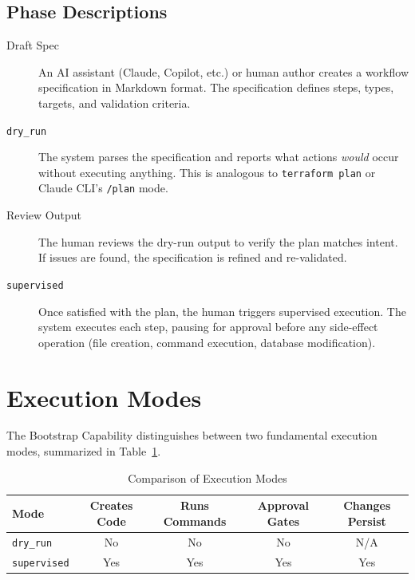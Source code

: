 \documentclass[11pt,letterpaper]{article}
\begin{document}
\subsection{Phase Descriptions}

\begin{description}
    \item[Draft Spec] An AI assistant (Claude, Copilot, etc.) or human author creates a workflow specification in Markdown format. The specification defines steps, types, targets, and validation criteria.
    
    \item[\texttt{dry\_run}] The system parses the specification and reports what actions \textit{would} occur without executing anything. This is analogous to \texttt{terraform plan} or Claude CLI's \texttt{/plan} mode.
    
    \item[Review Output] The human reviews the dry-run output to verify the plan matches intent. If issues are found, the specification is refined and re-validated.
    
    \item[\texttt{supervised}] Once satisfied with the plan, the human triggers supervised execution. The system executes each step, pausing for approval before any side-effect operation (file creation, command execution, database modification).
\end{description}

\section{Execution Modes}

The Bootstrap Capability distinguishes between two fundamental execution modes, summarized in Table~\ref{tab:modes}.

\begin{table}[h]
\centering
\caption{Comparison of Execution Modes}
\label{tab:modes}
\begin{tabular}{@{}lcccc@{}}
\toprule
\textbf{Mode} & \textbf{Creates Code} & \textbf{Runs Commands} & \textbf{Approval Gates} & \textbf{Changes Persist} \\
\midrule
\texttt{dry\_run}   & No  & No  & No  & N/A \\
\texttt{supervised} & Yes & Yes & Yes & Yes \\
\bottomrule
\end{tabular}
\end{table}
\end{document}
